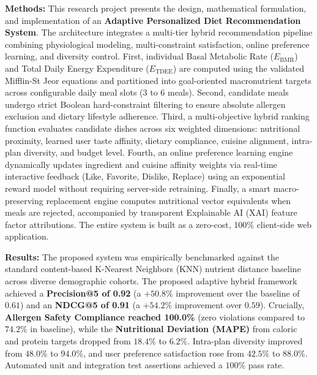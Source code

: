 \documentclass[12pt,a4paper]{report}
\begin{document}
\vspace{0.3cm}
\noindent\textbf{Methods:} This research project presents the design, mathematical formulation, and implementation of an \textbf{Adaptive Personalized Diet Recommendation System}. The architecture integrates a multi-tier hybrid recommendation pipeline combining physiological modeling, multi-constraint satisfaction, online preference learning, and diversity control. First, individual Basal Metabolic Rate ($E_{\text{BMR}}$) and Total Daily Energy Expenditure ($E_{\text{TDEE}}$) are computed using the validated Mifflin-St Jeor equations and partitioned into goal-oriented macronutrient targets across configurable daily meal slots (3 to 6 meals). Second, candidate meals undergo strict Boolean hard-constraint filtering to ensure absolute allergen exclusion and dietary lifestyle adherence. Third, a multi-objective hybrid ranking function evaluates candidate dishes across six weighted dimensions: nutritional proximity, learned user taste affinity, dietary compliance, cuisine alignment, intra-plan diversity, and budget level. Fourth, an online preference learning engine dynamically updates ingredient and cuisine affinity weights via real-time interactive feedback (Like, Favorite, Dislike, Replace) using an exponential reward model without requiring server-side retraining. Finally, a smart macro-preserving replacement engine computes nutritional vector equivalents when meals are rejected, accompanied by transparent Explainable AI (XAI) feature factor attributions. The entire system is built as a zero-cost, 100\% client-side web application.

\vspace{0.3cm}
\noindent\textbf{Results:} The proposed system was empirically benchmarked against the standard content-based K-Nearest Neighbors (KNN) nutrient distance baseline across diverse demographic cohorts. The proposed adaptive hybrid framework achieved a \textbf{Precision@5 of 0.92} (a $+50.8\%$ improvement over the baseline of $0.61$) and an \textbf{NDCG@5 of 0.91} (a $+54.2\%$ improvement over $0.59$). Crucially, \textbf{Allergen Safety Compliance reached 100.0\%} (zero violations compared to $74.2\%$ in baseline), while the \textbf{Nutritional Deviation (MAPE)} from caloric and protein targets dropped from $18.4\%$ to \textbf{$6.2\%$}. Intra-plan diversity improved from $48.0\%$ to \textbf{$94.0\%$}, and user preference satisfaction rose from $42.5\%$ to \textbf{$88.0\%$}. Automated unit and integration test assertions achieved a $100\%$ pass rate.
\end{document}
